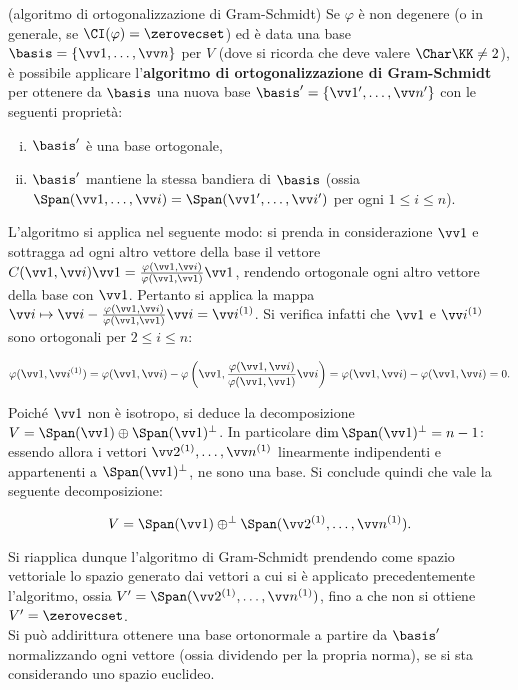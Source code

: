 \begin{remark} (algoritmo di ortogonalizzazione di Gram-Schmidt)
	Se $\varphi$ è non degenere (o in generale, se $\CI(\varphi) = \zerovecset$) ed è
	data una base $\basis = \{ \vv 1, \ldots, \vv n \}$ per $V$ (dove si ricorda che deve valere
	$\Char \KK \neq 2$), è possibile
	applicare l'\textbf{algoritmo di ortogonalizzazione di Gram-Schmidt} per ottenere
	da $\basis$ una nuova base $\basis' = \{ \vv 1', \ldots, \vv n' \}$ con le seguenti proprietà:
	
	\begin{enumerate}[(i)]
		\item $\basis'$ è una base ortogonale,
		\item $\basis'$ mantiene la stessa bandiera di $\basis$ (ossia $\Span(\vv 1, \ldots, \vv i) = \Span(\vv 1', \ldots, \vv i')$ per ogni $1 \leq i \leq n$).
	\end{enumerate}
	
	L'algoritmo si applica nel seguente modo: si prenda in considerazione $\vv 1$ e sottragga ad ogni altro vettore
	della base il vettore $C(\vv 1, \vv i) \vv 1 = \frac{\varphi(\vv 1, \vv i)}{\varphi(\vv 1, \vv 1)} \vv 1$,
	rendendo ortogonale ogni altro vettore della base con $\vv 1$. Pertanto si applica la mappa
	$\vv i \mapsto \vv i - \frac{\varphi(\vv 1, \vv i)}{\varphi(\vv 1, \vv 1)} \vv i = \vv i ^{(1)}$.
	Si verifica infatti che $\vv 1$ e $\vv i ^{(1)}$ sono ortogonali per $2 \leq i \leq n$:
	
	\[ \varphi(\vv 1, \vv i^{(1)}) = \varphi(\vv 1, \vv i) - \varphi\left(\vv 1, \frac{\varphi(\vv 1, \vv i)}{\varphi(\vv 1, \vv 1)} \vv i\right) = \varphi(\vv 1, \vv i) - \varphi(\vv 1, \vv i) = 0. \]
	
	Poiché $\vv 1$ non è isotropo, si deduce la decomposizione $V = \Span(\vv 1) \oplus \Span(\vv 1)^\perp$.
	In particolare $\dim \Span(\vv 1)^\perp = n-1$: essendo allora i vettori $\vv 2 ^{(1)}, \ldots, \vv n ^{(1)}$
	linearmente indipendenti e appartenenti a $\Span(\vv 1)^\perp$, ne sono una base. Si conclude quindi
	che vale la seguente decomposizione:
	
	\[ V = \Span(\vv 1) \oplus^\perp \Span(\vv 2 ^{(1)}, \ldots, \vv n ^{(1)}). \]
	
	\vskip 0.05in
	
	Si riapplica dunque l'algoritmo di Gram-Schmidt prendendo come spazio vettoriale lo spazio generato dai
	vettori a cui si è applicato precedentemente l'algoritmo, ossia $V' = \Span(\vv 2 ^{(1)}, \ldots, \vv n ^{(1)})$,
	fino a che non si ottiene $V' = \zerovecset$. \\
	
	Si può addirittura ottenere una base ortonormale a partire da $\basis'$ normalizzando ogni vettore (ossia
	dividendo per la propria norma), se si sta considerando uno spazio euclideo.
\end{remark}

